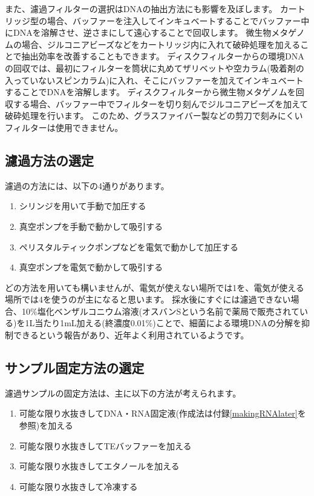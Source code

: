 \documentclass[titlepage,10pt,a4paper]{jsbook}
\begin{document}
また、濾過フィルターの選択はDNAの抽出方法にも影響を及ぼします。
カートリッジ型の場合、バッファーを注入してインキュベートすることでバッファー中にDNAを溶解させ、逆さまにして遠心することで回収します\citep{Miya2016}。
微生物メタゲノムの場合、ジルコニアビーズなどをカートリッジ内に入れて破砕処理を加えることで抽出効率を改善することもできます\citep{Ushio2019}。
ディスクフィルターからの環境DNAの回収では、最初にフィルターを筒状に丸めてザリベットや空カラム(吸着剤の入っていないスピンカラム)に入れ、そこにバッファーを加えてインキュベートすることでDNAを溶解します。
ディスクフィルターから微生物メタゲノムを回収する場合、バッファー中でフィルターを切り刻んでジルコニアビーズを加えて破砕処理を行います。
このため、グラスファイバー製などの剪刀で刻みにくいフィルターは使用できません。

\subsection{濾過方法の選定}

濾過の方法には、以下の4通りがあります。

\begin{enumerate}
\item シリンジを用いて手動で加圧する
\item 真空ポンプを手動で動かして吸引する
\item ペリスタルティックポンプなどを電気で動かして加圧する
\item 真空ポンプを電気で動かして吸引する
\end{enumerate}

どの方法を用いても構いませんが、電気が使えない場所では1を、電気が使える場所では4を使うのが主になると思います。
採水後にすぐには濾過できない場合、10\%塩化ベンザルコニウム溶液(オスバンSという名前で薬局で販売されている)を1L当たり1mL加える(終濃度0.01\%)ことで、細菌による環境DNAの分解を抑制できるという報告\citep{Yamanaka2017}があり、近年よく利用されているようです。

\subsection{サンプル固定方法の選定}

濾過サンプルの固定方法は、主に以下の方法が考えられます。

\begin{enumerate}
\item 可能な限り水抜きしてDNA・RNA固定液(作成法は付録\ref{makingRNAlater}を参照)を加える
\item 可能な限り水抜きしてTEバッファーを加える
\item 可能な限り水抜きしてエタノールを加える
\item 可能な限り水抜きして冷凍する
\end{enumerate}
\end{document}
